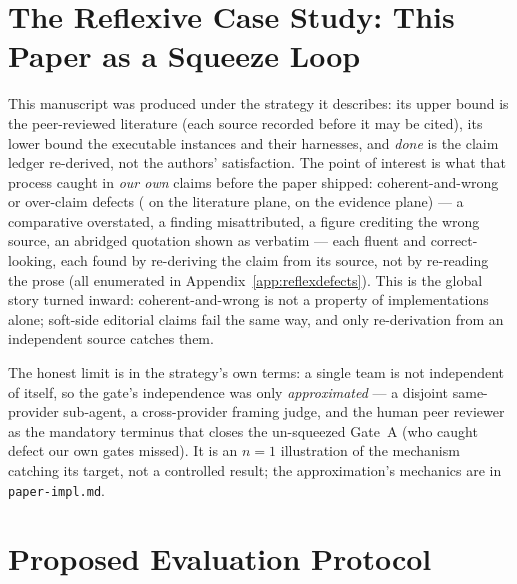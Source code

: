 \documentclass[11pt]{article}
\newcommand{\code}[1]{\texttt{#1}}
\begin{document}
\section{The Reflexive Case Study: This Paper as a Squeeze Loop}
\label{sec:reflexive}

This manuscript was produced under the strategy it describes: its upper bound is the peer-reviewed
literature (each source recorded before it may be cited), its lower bound the \ResReflexTerrains{}
executable instances and their harnesses, and \emph{done} is the claim ledger re-derived, not the
authors' satisfaction. The point of interest is what that process caught in \emph{our own} claims before
the paper shipped: \ResReflexDefects{} coherent-and-wrong or over-claim defects (\ResReflexDefectsLit{}
on the literature plane, \ResReflexDefectsEvid{} on the evidence plane) --- a comparative overstated, a
finding misattributed, a figure crediting the wrong source, an abridged quotation shown as verbatim ---
each fluent and correct-looking, each found by re-deriving the claim from its source, not by re-reading
the prose (all \ResReflexDefects{} enumerated in Appendix~\ref{app:reflexdefects}). This is the global
story turned inward: coherent-and-wrong is not a property of implementations alone; soft-side editorial
claims fail the same way, and only re-derivation from an independent source catches them.

The honest limit is in the strategy's own terms: a single team is not independent of itself, so the
gate's independence was only \emph{approximated} --- a disjoint same-provider sub-agent, a cross-provider
framing judge, and the human peer reviewer as the mandatory terminus that closes the un-squeezed Gate~A
(who caught \ResCalibExternalCatches{} defect our own gates missed). It is an $n{=}1$ illustration of the
mechanism catching its target, not a controlled result; the approximation's mechanics are in
\code{paper-impl.md}.

\section{Proposed Evaluation Protocol}
\label{sec:eval}
\end{document}
